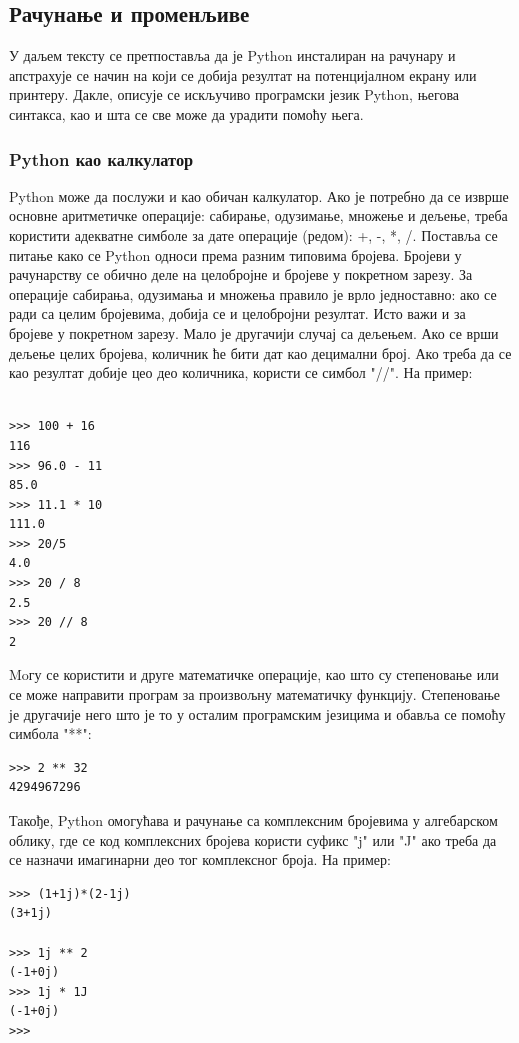 \subsection{Рачунање и променљиве}
У даљем тексту се претпоставља да је Python инсталиран на рачунару и апстрахује се начин на који се добија резултат на потенцијалном екрану или принтеру. Дакле, описује се искључиво програмски језик Python, његова синтакса, као и шта се све може да урадити помоћу њега.

\subsubsection{Python као калкулатор}
Python може да послужи и као обичан калкулатор\cite{van2003introduction,lutz2009learning}. Ако је потребно да се изврше основне аритметичке операције: сабирање, одузимање, множење и дељење, треба користити адекватне симболе за дате операције (редом): +, -, *, /. Поставља се питање како се Python односи према разним типовима бројева. Бројеви у рачунарству се обично деле на целобројне и бројеве у покретном зарезу. За операције сабирања, одузимања и множења правило је врло једноставно: ако се ради са целим бројевима, добија се и целобројни резултат. Исто важи и за бројеве у покретном зарезу. Мало је другачији случај са дељењем. Ако се врши дељење целих бројева, количник ће бити дат као децимални број. Ако треба да се као резултат добије цео део количника, користи се симбол "//". На пример:
\begin{lstlisting}[caption = Примери операција са бројевима, label = racun]

>>> 100 + 16
116
>>> 96.0 - 11
85.0
>>> 11.1 * 10
111.0
>>> 20/5
4.0
>>> 20 / 8
2.5
>>> 20 // 8
2
\end{lstlisting}
Moгу се користити и друге математичке операције, као што су степеновање или се може направити програм за произвољну математичку функцију. Степеновање је другачије него што је то у осталим програмским језицима и обавља се помоћу симбола "**":
\begin{lstlisting}[caption = Степеновање, label = stepen]
>>> 2 ** 32
4294967296
\end{lstlisting}
Такође, Python омогућава и рачунање са комплексним бројевима у алгебарском облику, где се код комплексних бројева користи суфикс "j" или "J" ако треба да се назначи имагинарни део тог комплексног броја. На пример:
\begin{lstlisting}[caption = Операције са комплексним бројевима, label = kompleksni]
>>> (1+1j)*(2-1j)
(3+1j)

>>> 1j ** 2
(-1+0j)
>>> 1j * 1J
(-1+0j)
>>>
\end{lstlisting}

